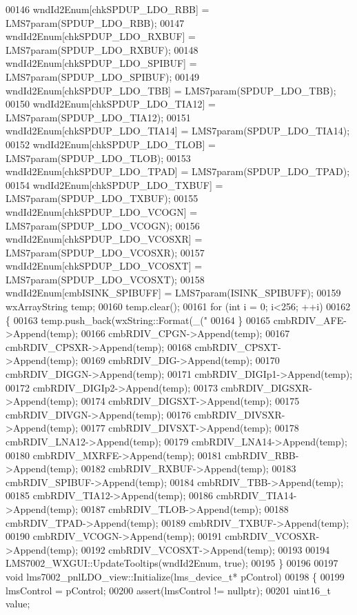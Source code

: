 \begin{DoxyCode}
00146     wndId2Enum[chkSPDUP_LDO_RBB] = LMS7param(SPDUP_LDO_RBB);
00147     wndId2Enum[chkSPDUP_LDO_RXBUF] = LMS7param(SPDUP_LDO_RXBUF);
00148     wndId2Enum[chkSPDUP_LDO_SPIBUF] = LMS7param(SPDUP_LDO_SPIBUF);
00149     wndId2Enum[chkSPDUP_LDO_TBB] = LMS7param(SPDUP_LDO_TBB);
00150     wndId2Enum[chkSPDUP_LDO_TIA12] = LMS7param(SPDUP_LDO_TIA12);
00151     wndId2Enum[chkSPDUP_LDO_TIA14] = LMS7param(SPDUP_LDO_TIA14);
00152     wndId2Enum[chkSPDUP_LDO_TLOB] = LMS7param(SPDUP_LDO_TLOB);
00153     wndId2Enum[chkSPDUP_LDO_TPAD] = LMS7param(SPDUP_LDO_TPAD);
00154     wndId2Enum[chkSPDUP_LDO_TXBUF] = LMS7param(SPDUP_LDO_TXBUF);
00155     wndId2Enum[chkSPDUP_LDO_VCOGN] = LMS7param(SPDUP_LDO_VCOGN);
00156     wndId2Enum[chkSPDUP_LDO_VCOSXR] = LMS7param(SPDUP_LDO_VCOSXR);
00157     wndId2Enum[chkSPDUP_LDO_VCOSXT] = LMS7param(SPDUP_LDO_VCOSXT);
00158     wndId2Enum[cmbISINK_SPIBUFF] = LMS7param(ISINK\_SPIBUFF);
00159     wxArrayString temp;
00160     temp.clear();
00161     \textcolor{keywordflow}{for} (\textcolor{keywordtype}{int} i = 0; i<256; ++i)
00162     \{
00163         temp.push\_back(wxString::Format(\_(\textcolor{stringliteral}{"%
00164     \}
00165     cmbRDIV_AFE->Append(temp);
00166     cmbRDIV_CPGN->Append(temp);
00167     cmbRDIV_CPSXR->Append(temp);
00168     cmbRDIV_CPSXT->Append(temp);
00169     cmbRDIV_DIG->Append(temp);
00170     cmbRDIV_DIGGN->Append(temp);
00171     cmbRDIV_DIGIp1->Append(temp);
00172     cmbRDIV_DIGIp2->Append(temp);
00173     cmbRDIV_DIGSXR->Append(temp);
00174     cmbRDIV_DIGSXT->Append(temp);
00175     cmbRDIV_DIVGN->Append(temp);
00176     cmbRDIV_DIVSXR->Append(temp);
00177     cmbRDIV_DIVSXT->Append(temp);
00178     cmbRDIV_LNA12->Append(temp);
00179     cmbRDIV_LNA14->Append(temp);
00180     cmbRDIV_MXRFE->Append(temp);
00181     cmbRDIV_RBB->Append(temp);
00182     cmbRDIV_RXBUF->Append(temp);
00183     cmbRDIV_SPIBUF->Append(temp);
00184     cmbRDIV_TBB->Append(temp);
00185     cmbRDIV_TIA12->Append(temp);
00186     cmbRDIV_TIA14->Append(temp);
00187     cmbRDIV_TLOB->Append(temp);
00188     cmbRDIV_TPAD->Append(temp);
00189     cmbRDIV_TXBUF->Append(temp);
00190     cmbRDIV_VCOGN->Append(temp);
00191     cmbRDIV_VCOSXR->Append(temp);
00192     cmbRDIV_VCOSXT->Append(temp);
00193 
00194     LMS7002_WXGUI::UpdateTooltips(wndId2Enum, \textcolor{keyword}{true});
00195 \}
00196 
00197 \textcolor{keywordtype}{void} lms7002_pnlLDO_view::Initialize(lms_device_t* pControl)
00198 \{
00199     lmsControl = pControl;
00200     assert(lmsControl != \textcolor{keyword}{nullptr});
00201     uint16\_t value;
}
\end{DoxyCode}
